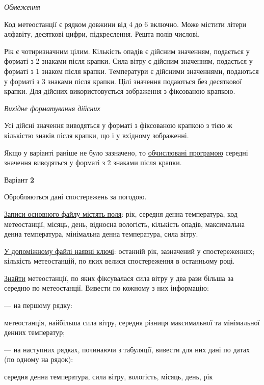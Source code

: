 \documentclass[11pt, ukrainian]{article}
\begin{document}

\bigskip\textit{Обмеження}

Код метеостанції є рядком довжини від 4 до 6 включно.
Може містити літери алфавіту, десяткові цифри, підкреслення. Решта полів числові.

Рік є чотиризначним цілим.
Кількість опадів є дійсним значенням, подається у форматі з 2 знаками після крапки.
Сила вітру є дійсним значенням, подається у форматі з 1 знаком після крапки.
Температури є дійсними значеннями, подаються у форматі з 3 знаками після крапки.
Цілі значення подаються без десяткової крапки.
Для дійсних використовується зображення з фіксованою крапкою.

\textit{Вихідне форматування дійсних}

Усі дійсні значення виводяться у форматі з фіксованою крапкою з тією ж кількістю знаків після крапки, що і у вхідному зображенні.

Якщо у варіанті раніше не було зазначено, то \underline{обчислювані програмою} середні значення виводяться у форматі з 2 знаками після крапки.


\par
\newpage
{\center Варіант  \No \textbf { 2 }\par}
\bigskip
Обробляються дані спостережень за погодою. 

\underline{Записи основного файлу містять поля}: рік, середня денна температура, код метеостанції, місяць, день, відносна вологість, кількість опадів, максимальна денна температура, мінімальна денна температура, сила вітру.

\underline{У допоміжному файлі наявні ключі}: останній рік, зазначений у спостереженнях; кількість метеостанцій, по яких велися спостереження в останньому році.

\underline{Знайти} метеостанції, по яких фіксувалася сила вітру у два рази більша за середню по метеостанції. Вивести по кожному з них інформацію:\par
{\noindent}--- на першому рядку:\par
метеостанція, найбільша сила вітру, середня різниця максимальної та мінімальної денних температур;

{\noindent}--- на наступних рядках, починаючи з табуляції, вивести для них дані по датах (по одному на рядок):\par
середня денна температура, сила вітру, вологість, місяць, день, рік
\end{document}
